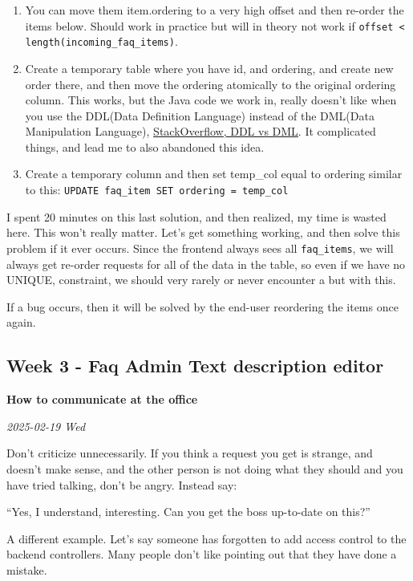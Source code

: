 \documentclass[../main.tex]{subfiles}
\begin{document}
\begin{enumerate}
\def\labelenumi{\arabic{enumi}.}
\item You can move them item.ordering to a very high offset and then re-order the items below. Should work in practice but will in theory not work if \verb|offset < length(incoming_faq_items)|. 

\item  Create a temporary table where you have id, and ordering, and create new order there, and then move the ordering atomically to the original ordering column. This works, but the Java code we work in, really doesn't like when you use the DDL(Data Definition Language) instead of the DML(Data Manipulation Language), \href{https://stackoverflow.com/questions/2578194/what-are-ddl-and-dml}{StackOverflow, DDL vs DML}. It complicated things, and lead me to also abandoned this idea.
\item Create a temporary column and then set temp\_col equal to ordering similar to this: \verb|UPDATE faq_item SET ordering = temp_col|
\end{enumerate}


I spent 20 minutes on this last solution, and then realized, my time is wasted here. This won't really matter. Let's get something working, and then solve this problem if it ever occurs. Since the frontend always sees all \verb|faq_items|, we will always get re-order requests for all of the data in the table, so even if we have no UNIQUE, constraint, we should very rarely or never encounter a but with this.

If a bug occurs, then it will be solved by the end-user reordering the items once again.\strut

\subsection{Week 3 - Faq Admin Text description editor} 

\textbf{How to communicate at the office}

\textit{2025-02-19 Wed}

Don't criticize unnecessarily. If you think a request you get is strange, and doesn't make sense, and the other person is not doing what they should and you have tried talking, don't be angry. Instead say:

``Yes, I understand, interesting. 
Can you get the boss up-to-date on this?''



A different example. Let's say someone has forgotten to add access control to the backend controllers. Many people don't like pointing out that they have done a mistake.
\end{document}
